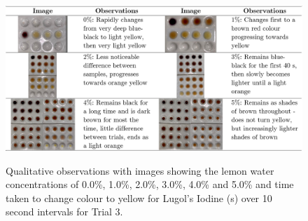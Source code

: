 \documentclass[12pt]{article}
\begin{document}
\begin{center}
    \begin{figure}[h]
    \centering
    \caption{Qualitative observations with images showing the lemon water concentrations of 0.0\%, 1.0\%, 2.0\%, 3.0\%, 4.0\% and 5.0\% and time taken to change colour to yellow for Lugol's Iodine (s) over 10 second intervals for Trial 3.}
    \includegraphics[width=\textwidth]{images/qualtable.png}
    \label{qualitative}
\end{figure}
\end{center}

\vspace{-20mm}
\end{document}
